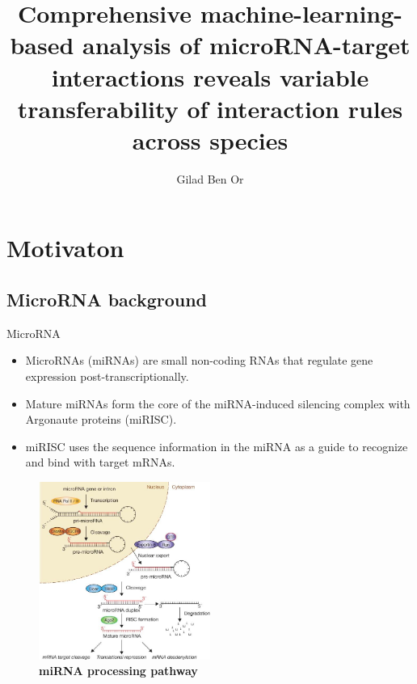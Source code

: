 \documentclass{beamer}
\title[Thesis]{Comprehensive machine-learning-based analysis of microRNA-target interactions reveals variable transferability of interaction rules across species}
\author[A. Author]{Gilad Ben Or}
\begin{document}
	\typesetFrontSlides


\section{Motivaton}

\subsection[Background]{MicroRNA background}
\begin{frame}{MicroRNA}
	\begin{itemize}
\item MicroRNAs (miRNAs) are small non-coding RNAs that regulate gene expression post-transcriptionally. 
\item Mature miRNAs form the core of the miRNA-induced silencing complex with Argonaute proteins (miRISC).
\item miRISC uses the sequence information in the miRNA as a guide to recognize and bind with target mRNAs.
\end{itemize}

\begin{figure}[ht!]
	  \centering
	      	\caption{\textbf{miRNA processing pathway}}
	      		  \label{fig:miRNAprocessingpathway}

    \includegraphics[width=0.5\textwidth]{images/ThelinearcanonicalpathwayofmicroRNAprocessing.jpg} 
\end{figure}

\end{frame}
\end{document}
